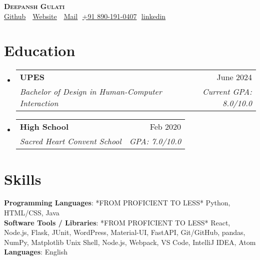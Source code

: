 \documentclass[letterpaper,11pt]{article}
\makeatletter
\newcommand{\resumeSubheading}[4]{
  \vspace{-2pt}\item
    \begin{tabular*}{0.97\textwidth}[t]{l@{\extracolsep{\fill}}r}
      \textbf{#1} & #2 \\
      \textit{\small#3} & \textit{\small #4} \\
    \end{tabular*}\vspace{-7pt}
}
\newcommand{\resumeSubHeadingListStart}{\begin{itemize}[leftmargin=0.15in, label={}]}
\newcommand{\resumeSubHeadingListEnd}{\end{itemize}}
\makeatother
\begin{document}
\begin{flushright}
  \vspace{-4pt}
\end{flushright}

\vspace{-7pt}

\begin{center}
    \textbf{\Huge \scshape Deepansh Gulati} \\ \vspace{8pt}
    \small 
    \faGithub
    \href{https://github.com/NeuralWordsmith}{\underline{Github}} $  $
    \faCode $  $
    \href{https://neuralwordsmith.github.io/}
    {\underline{Website}} $  $
    \faEnvelope$  $
    \href{mailto:deepictd@icloud.com}
    {\underline{Mail}}
    \faPhone$  $
    \underline{+91 890-191-0407}
    \faLinkedin$  $
    \href{https://linkedin.com/in/deepictd}{\underline{linkedin}} $  $
\end{center}

\section{Education}
  \resumeSubHeadingListStart
  
    \resumeSubheading
      {UPES}{June 2024}
      {Bachelor of Design in Human-Computer Interaction}{Current GPA: 8.0/10.0}
      
    \resumeSubheading
      {High School \footnotesize}{Feb 2020}
      {Sacred Heart Convent School}{GPA: 7.0/10.0}

  \resumeSubHeadingListEnd

\section{Skills}
 \begin{itemize}[leftmargin=0.15in, label={}]
    \small{\item{
    
     \textbf{Programming Languages}{: *FROM PROFICIENT TO LESS* Python, HTML/CSS, Java} \\
     
     \textbf{Software Tools / Libraries}{: *FROM PROFICIENT TO LESS* React, Node.js, Flask, JUnit, WordPress, Material-UI, FastAPI, Git/GitHub, pandas, NumPy, Matplotlib Unix Shell, Node.js, Webpack, VS Code, IntelliJ IDEA, Atom} \\

     \textbf{Languages}{: English} \\
     
    }}
 \end{itemize}
\end{document}
